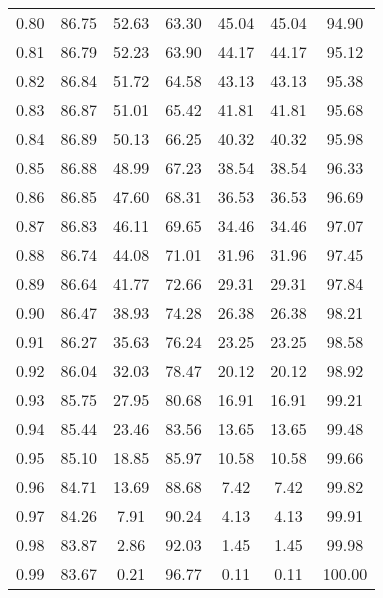 \begin{tabular}{|c|c|c|c|c|c|c|}
      0.80 &     86.75 &     52.63 &      63.30 &   45.04 &      45.04 &         94.90 \\
      0.81 &     86.79 &     52.23 &      63.90 &   44.17 &      44.17 &         95.12 \\
      0.82 &     86.84 &     51.72 &      64.58 &   43.13 &      43.13 &         95.38 \\
      0.83 &     86.87 &     51.01 &      65.42 &   41.81 &      41.81 &         95.68 \\
      0.84 &     86.89 &     50.13 &      66.25 &   40.32 &      40.32 &         95.98 \\
      0.85 &     86.88 &     48.99 &      67.23 &   38.54 &      38.54 &         96.33 \\
      0.86 &     86.85 &     47.60 &      68.31 &   36.53 &      36.53 &         96.69 \\
      0.87 &     86.83 &     46.11 &      69.65 &   34.46 &      34.46 &         97.07 \\
      0.88 &     86.74 &     44.08 &      71.01 &   31.96 &      31.96 &         97.45 \\
      0.89 &     86.64 &     41.77 &      72.66 &   29.31 &      29.31 &         97.84 \\
      0.90 &     86.47 &     38.93 &      74.28 &   26.38 &      26.38 &         98.21 \\
      0.91 &     86.27 &     35.63 &      76.24 &   23.25 &      23.25 &         98.58 \\
      0.92 &     86.04 &     32.03 &      78.47 &   20.12 &      20.12 &         98.92 \\
      0.93 &     85.75 &     27.95 &      80.68 &   16.91 &      16.91 &         99.21 \\
      0.94 &     85.44 &     23.46 &      83.56 &   13.65 &      13.65 &         99.48 \\
      0.95 &     85.10 &     18.85 &      85.97 &   10.58 &      10.58 &         99.66 \\
      0.96 &     84.71 &     13.69 &      88.68 &    7.42 &       7.42 &         99.82 \\
      0.97 &     84.26 &      7.91 &      90.24 &    4.13 &       4.13 &         99.91 \\
      0.98 &     83.87 &      2.86 &      92.03 &    1.45 &       1.45 &         99.98 \\
      0.99 &     83.67 &      0.21 &      96.77 &    0.11 &       0.11 &        100.00 \\
\bottomrule
\end{tabular}
